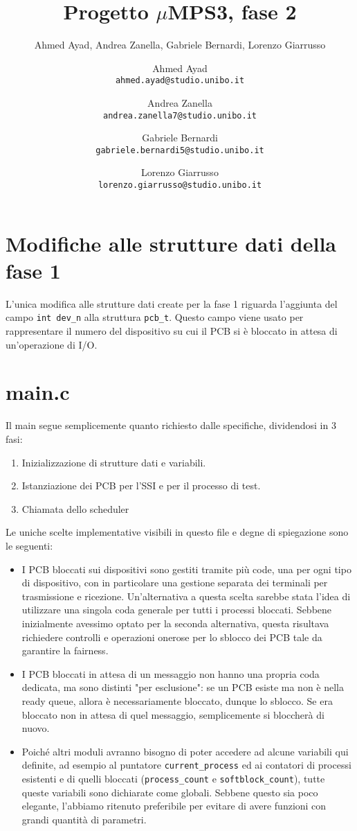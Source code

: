 \documentclass[a4paper]{article}
\title{Progetto $\mu$MPS3, fase 2}
\author{Ahmed Ayad, Andrea Zanella, Gabriele Bernardi, Lorenzo Giarrusso}
\author{
 Ahmed Ayad\\
  \texttt{ahmed.ayad@studio.unibo.it}
  \and
  Andrea Zanella\\
  \texttt{andrea.zanella7@studio.unibo.it}
  \and
  Gabriele Bernardi\\
  \texttt{gabriele.bernardi5@studio.unibo.it}
  \and
  Lorenzo Giarrusso\\
  \texttt{lorenzo.giarrusso@studio.unibo.it}
}
\begin{document}
\maketitle
\pagebreak
\tableofcontents
\pagebreak

\section{Modifiche alle strutture dati della fase 1}
L'unica modifica alle strutture dati create per la fase 1 riguarda l'aggiunta del campo \verb+int dev_n+ alla struttura \verb+pcb_t+. Questo campo viene
usato per rappresentare il numero del dispositivo su cui il PCB si è bloccato in attesa di un'operazione di I/O.

\section{main.c}
Il main segue semplicemente quanto richiesto dalle specifiche, dividendosi in 3 fasi:
\begin{enumerate}
	\item Inizializzazione di strutture dati e variabili.
	\item Istanziazione dei PCB per l'SSI e per il processo di test.
	\item Chiamata dello scheduler
\end{enumerate}
Le uniche scelte implementative visibili in questo file e degne di spiegazione sono le seguenti:
\begin{itemize}  
	\item I PCB bloccati sui dispositivi sono gestiti tramite più code, una per ogni tipo di dispositivo, con in particolare una gestione separata dei terminali 
		per trasmissione e ricezione. Un'alternativa a questa scelta sarebbe stata l'idea di utilizzare una singola coda generale per tutti i processi bloccati.
		Sebbene inizialmente avessimo optato per la seconda alternativa, questa risultava richiedere controlli e operazioni onerose per lo sblocco dei PCB 
		tale da garantire la fairness.
	\item I PCB bloccati in attesa di un messaggio non hanno una propria coda dedicata, ma sono distinti "per esclusione": se un PCB esiste ma non è nella
		ready queue, allora è necessariamente bloccato, dunque lo sblocco. Se era bloccato non in attesa di quel messaggio, semplicemente si 
		bloccherà di nuovo.
	\item Poiché altri moduli avranno bisogno di poter accedere ad alcune variabili qui definite, ad esempio al puntatore \verb+current_process+ ed ai 
		contatori di processi esistenti e di quelli bloccati (\verb+process_count+ e \verb+softblock_count+), tutte queste variabili sono dichiarate come 
		globali. Sebbene questo sia poco elegante, l'abbiamo ritenuto preferibile per evitare di avere funzioni con grandi quantità di parametri.
\end{itemize}
\end{document}
